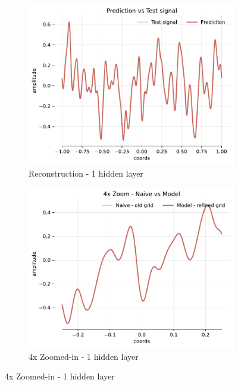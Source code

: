 \begin{figure}[!h]
    \centering
    \begin{subfigure}[b]{0.32\textwidth}
        \centering
        \includegraphics[width=\textwidth]{img/ch3/pred-32hf-1hl-6w-sub4.pdf}
        \caption{Reconstruction - 1 hidden layer}
    \end{subfigure}
    \begin{subfigure}[b]{0.32\textwidth}
        \centering
        \includegraphics[width=\textwidth]{img/ch3/4x-32hf-1hl-6w-sub4.pdf}
        \caption{4x Zoomed-in - 1 hidden layer}

\end{subfigure}
\end{figure}
